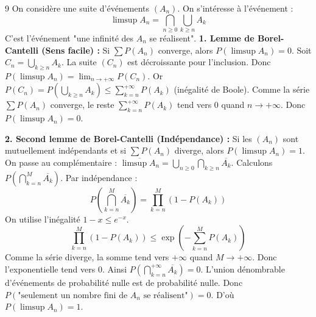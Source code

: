 \begin{correction}{9}
On considère une suite d'événements $(A_n)$. On s'intéresse à l'événement :
$$ \limsup A_n = \bigcap_{n \ge 0} \bigcup_{k \ge n} A_k $$
C'est l'événement "une infinité des $A_n$ se réalisent".
\textbf{1. Lemme de Borel-Cantelli (Sens facile) :}
Si $\sum P(A_n)$ converge, alors $P(\limsup A_n) = 0$.
Soit $C_n = \bigcup_{k \ge n} A_k$. La suite $(C_n)$ est décroissante pour l'inclusion.
Donc $P(\limsup A_n) = \lim_{n \to + \infty} P(C_n)$.
Or $P(C_n) = P(\bigcup_{k \ge n} A_k) \le \sum_{k=n}^{+ \infty} P(A_k)$ (inégalité de Boole).
Comme la série $\sum P(A_n)$ converge, le reste $\sum_{k=n}^{+ \infty} P(A_k)$ tend vers 0 quand $n \to + \infty$.
Donc $P(\limsup A_n) = 0$.

\textbf{2. Second lemme de Borel-Cantelli (Indépendance) :}
Si les $(A_n)$ sont mutuellement indépendants et si $\sum P(A_n)$ diverge, alors $P(\limsup A_n) = 1$.
On passe au complémentaire : $\overline{\limsup A_n} = \bigcup_{n \ge 0} \bigcap_{k \ge n} \overline{A_k}$.
Calculons $P(\bigcap_{k=n}^M \overline{A_k})$. Par indépendance :
$$ P(\bigcap_{k=n}^M \overline{A_k}) = \prod_{k=n}^M (1 - P(A_k)) $$
On utilise l'inégalité $1-x \le e^{-x}$.
$$ \prod_{k=n}^M (1 - P(A_k)) \le \exp\left( - \sum_{k=n}^M P(A_k) \right) $$
Comme la série diverge, la somme tend vers $+\infty$ quand $M \to + \infty$. Donc l'exponentielle tend vers 0.
Ainsi $P(\bigcap_{k=n}^{+ \infty} \overline{A_k}) = 0$.
L'union dénombrable d'événements de probabilité nulle est de probabilité nulle.
Donc $P(\text{"seulement un nombre fini de } A_n \text{ se réalisent"}) = 0$.
D'où $P(\limsup A_n) = 1$.
\end{correction}

